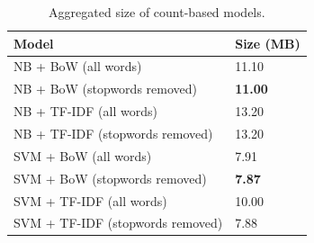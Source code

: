 \documentclass[a4paper,twoside,phd]{BYUPhys}
\begin{document}
\begin{table}[H]
	\centering
	
	\begin{tabular}{|p{4.2cm}|p{5cm}|}
		\hline
		
		\textbf{Model} & \textbf{Size (MB)}                                                                                                                                                                                                                                                                                                                                                    \\
		\hline                                                                                                                                              
		
		NB + BoW (all words)  & 11.10  \\
		\hline
		
		NB + BoW \newline (stopwords  removed)  & \textbf{11.00} \\
		\hline
		
		NB + TF-IDF \newline (all words) & 13.20 \\
		\hline
		
		NB + TF-IDF \newline (stopwords removed) & 13.20 \\
		\hline
		
		SVM + BoW  (all words)  & 7.91  \\
		\hline
		
		SVM + BoW \newline (stopwords removed)  & \textbf{7.87}  \\
		\hline
		
		SVM + TF-IDF \newline (all words) & 10.00 \\
		\hline
		
		SVM + TF-IDF \newline (stopwords removed) & 7.88 \\
		\hline
		

		
		
	\end{tabular}
	\caption{Aggregated size of count-based models.}
	\label{table:CountStorageRequirements}
\end{table}
\end{document}
